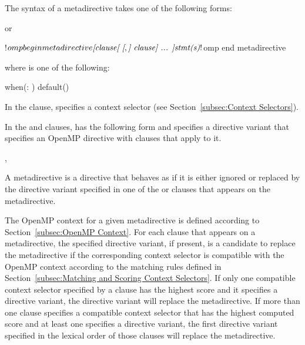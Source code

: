 \begin{fortranspecific}
The syntax of a metadirective takes one of the following forms:


or

\begin{ompfPragma}
!$omp begin metadirective \plc{[clause[ [},\plc{] clause] ... ]}
!$omp end metadirective
\end{ompfPragma}

\begin{samepage}
where  is one of the following:

\begin{indentedcodelist}
when(: )
default()
\end{indentedcodelist}
\end{samepage}

\end{fortranspecific}

In the  clause,  specifies a context
selector (see Section~\ref{subsec:Context Selectors}).


In the  and  clauses, 
has the following form and specifies a directive variant that specifies an OpenMP
directive with clauses that apply to it.

\begin{indentedcodelist}
\plc{ directive-name [clause[ [},\plc{] clause] ... ]}
\end{indentedcodelist}

\descr
A metadirective is a directive that behaves as if it is either ignored or
replaced by the directive variant specified in one of the  or
 clauses that appears on the metadirective.

The OpenMP context for a given metadirective is defined according to
Section~\ref{subsec:OpenMP Context}.  For each  clause that appears
on a metadirective, the specified directive variant, if present, is a candidate
to replace the metadirective if the corresponding context selector is compatible
with the OpenMP context according to the matching rules defined in
Section~\ref{subsec:Matching and Scoring Context Selectors}.  If only one
compatible context selector specified by a  clause has the highest
score and it specifies a directive variant, the directive variant will replace
the metadirective. If more than one  clause specifies a compatible
context selector that has the highest computed score and at least one specifies
a directive variant, the first directive variant specified in the lexical order
of those  clauses will replace the metadirective.


